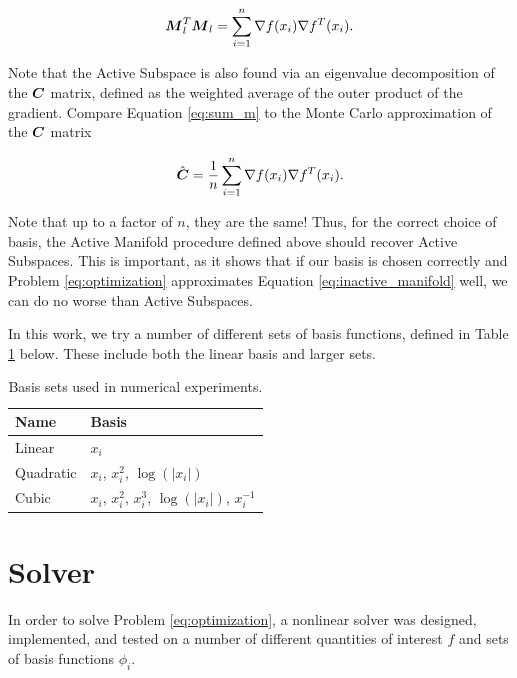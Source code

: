 \documentclass[]{aiaa-tc}%
\begin{document}
\begin{equation}
\label{eq:sum_m}
\boldsymbol{M}_l^T\boldsymbol{M}_l = \sum_{i=1}^n \nabla f(x_i) \nabla f^T(x_i).
\end{equation}

Note that the Active Subspace is also found via an eigenvalue decomposition of the $\boldsymbol{C}$ matrix, defined as the weighted average of the outer product of the gradient.\cite{constantine2015} Compare Equation \ref{eq:sum_m} to the Monte Carlo approximation of the $\boldsymbol{C}$ matrix

\begin{equation}
\label{eq:sum_c}
\hat{\boldsymbol{C}} = \frac{1}{n} \sum_{i=1}^n \nabla f(x_i) \nabla f^T(x_i).
\end{equation}

Note that up to a factor of $n$, they are the same! Thus, for the correct choice of basis, the Active Manifold procedure defined above should recover Active Subspaces. This is important, as it shows that if our basis is chosen correctly and Problem \ref{eq:optimization} approximates Equation \ref{eq:inactive_manifold} well, we can do no worse than Active Subspaces.

In this work, we try a number of different sets of basis functions, defined in Table \ref{tab:basis} below. These include both the linear basis and larger sets.

\begin{table}
\centering
\begin{tabular}{ll}
\toprule
Name & Basis \\
\midrule
Linear & $x_i$ \\
Quadratic & $x_i$, $x_i^2$, $\log(|x_i|)$ \\
Cubic & $x_i$, $x_i^2$, $x_i^3$, $\log(|x_i|)$, $x_i^{-1}$ \\
\bottomrule
\end{tabular}
\caption{Basis sets used in numerical experiments.}
\label{tab:basis}
\end{table}

\section{Solver} \label{sec:solver}
In order to solve Problem \ref{eq:optimization}, a nonlinear solver was designed, implemented, and tested on a number of different quantities of interest $f$ and sets of basis functions $\phi_i$.
\end{document}
